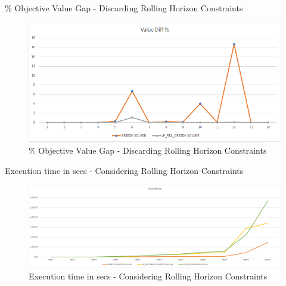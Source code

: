 \documentclass[11pt]{article}
\begin{document}
{\begin{landscape}
        \begin{table}[htb]
                \centering
                \caption[Short Caption for LoT]{\% Objective Value Gap - Discarding Rolling Horizon Constraints}\label{table:tbl_test_obj_diff_no_rh}
        \end{table}
        \begin{figure}[htp]
            \centering
            \includegraphics[width=12cm]{value_diff_no_rh}
            \caption{\% Objective Value Gap - Discarding Rolling Horizon Constraints}
            \label{fig:fig_value_diff_no_rh}
        \end{figure}
    \end{landscape}
\newpage
    \clearpage%
    \thispagestyle{empty}%
    \begin{landscape}%
        \begin{table}[htb]
                \centering
                \caption[Short Caption for LoT]{Execution time in secs - Considering Rolling Horizon Constraints}\label{table:tbl_test_durations_with_rh_ph2}
        \end{table}
        
        \begin{figure}[htp]
            \centering
            \includegraphics[width=20cm]{durations_with_rh}
            \caption{Execution time in secs - Considering Rolling Horizon Constraints}
            \label{fig:fig_durations_with_rh}
        \end{figure}
        

\end{landscape}}
\end{document}
